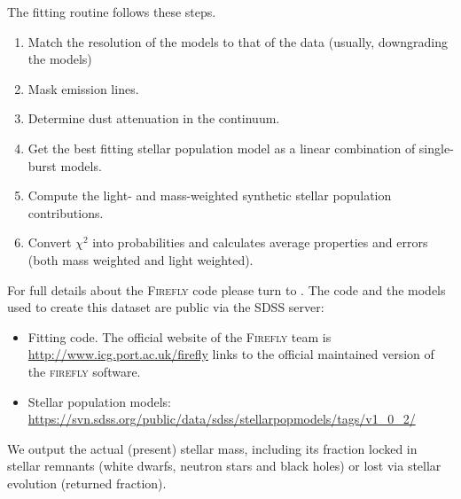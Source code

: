 \documentclass[onecolumn]{aa}
\begin{document}
The fitting routine follows these steps.
\begin{enumerate}
\item Match the resolution of the models to that of the data (usually, downgrading the models)
\item Mask emission lines.
\item Determine dust attenuation in the continuum.
\item Get the best fitting stellar population model as a linear combination of single-burst models.
\item Compute the light- and mass-weighted synthetic stellar population contributions.
\item Convert $\chi^2$ into probabilities and calculates average properties and errors (both mass weighted and light weighted).%
\end{enumerate}
For full details about the \textsc{Firefly} code please turn to \citet{firefly2017MNRAS}. 
The code and the models used to create this dataset are public via the SDSS server:
\begin{itemize}
\item Fitting code. The official website of the \textsc{Firefly} team is \url{http://www.icg.port.ac.uk/firefly} links to the official maintained version of the \textsc{firefly} software. 
\item Stellar population models: \url{https://svn.sdss.org/public/data/sdss/stellarpopmodels/tags/v1_0_2/} 
\end{itemize}
We output the actual (present) stellar mass, including its fraction locked in stellar remnants (white dwarfs, neutron stars and black holes) or lost via stellar evolution (returned fraction). 
\end{document}
